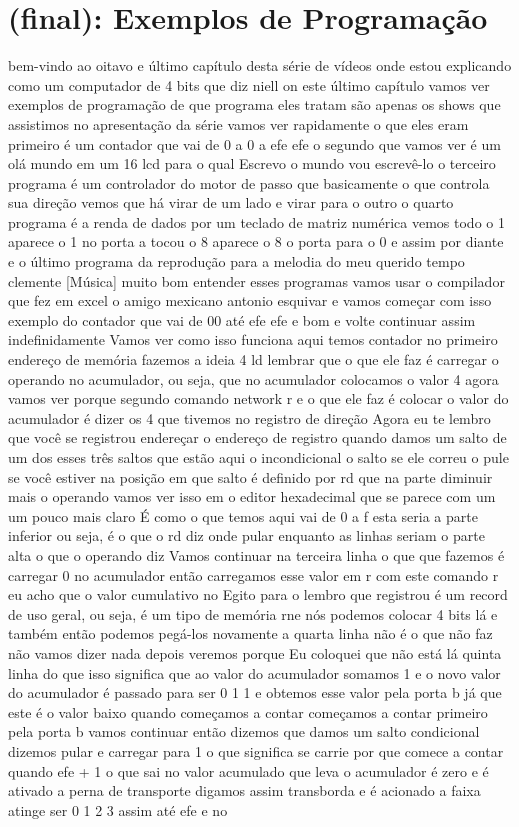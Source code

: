 \documentclass[oneside,11pt]{memoir} %
\begin{document}
\chapter{(final): Exemplos de Programação}
bem-vindo ao oitavo e último capítulo  desta série de vídeos onde estou  explicando como um  computador de 4 bits que diz niell on  este último capítulo  vamos ver exemplos de programação  de que programa eles tratam são apenas  os shows que assistimos no  apresentação da série  vamos ver rapidamente o que eles eram  primeiro é um contador que vai de 0 a 0 a  efe efe  o segundo que vamos ver é um olá  mundo em um 16 lcd para o qual  Escrevo o mundo vou escrevê-lo  o terceiro programa é um controlador do  motor de passo que basicamente o que  controla sua direção  vemos que há virar de um lado e virar  para o outro  o quarto programa é a renda de  dados por um teclado de matriz numérica  vemos todo o 1 aparece o 1 no  porta a tocou o 8 aparece o 8 o  porta para o 0 e assim por diante  e o último programa da reprodução  para a melodia do meu querido tempo clemente  [Música]  muito bom entender esses programas  vamos usar o compilador que fez  em excel o amigo mexicano antonio  esquivar e vamos começar com isso  exemplo do contador que vai de 00  até efe efe e bom e volte  continuar assim indefinidamente  Vamos ver como isso funciona  aqui temos contador  no primeiro endereço de memória  fazemos a ideia 4  ld lembrar que o que ele faz é carregar  o operando no acumulador, ou seja,  que no acumulador colocamos o valor 4  agora vamos ver porque  segundo comando network r e o que ele faz  é colocar o valor do acumulador é  dizer os 4 que tivemos no registro  de direção  Agora eu te lembro que você se registrou  endereçar o endereço de registro quando  damos um salto de um dos  esses três saltos que estão aqui o  incondicional o salto se ele correu o  pule se você estiver na posição em que  salto é definido por rd que na parte  diminuir mais o operando vamos ver isso em  o editor hexadecimal que se parece com um  um pouco mais claro  É como o que temos aqui vai  de 0 a f esta seria a parte inferior  ou seja, é o que o rd diz onde  pular enquanto as linhas seriam o  parte alta o que o operando diz  Vamos continuar na terceira linha o que  que fazemos é carregar 0 no acumulador  então carregamos esse valor em r  com este comando r eu acho que o  valor cumulativo no Egito para o  lembro que registrou é um record  de uso geral, ou seja, é um  tipo de memória rne nós  podemos colocar 4 bits lá e também  então podemos pegá-los novamente  a quarta linha não é o que não faz  não vamos dizer nada depois veremos porque  Eu coloquei que não está lá  quinta linha do que isso significa  que ao valor do acumulador somamos 1  e o novo valor do acumulador é passado para  ser 0 1 1  e obtemos esse valor pela porta b  já que este é o valor baixo quando  começamos a contar começamos a contar  primeiro pela porta b  vamos continuar  então dizemos que damos um salto  condicional dizemos pular e carregar  para 1 o que significa se carrie por que  comece a contar quando efe + 1  o que sai no valor acumulado que  leva o acumulador é zero e é ativado  a perna de transporte digamos assim  transborda e é acionado a faixa atinge  ser 0 1 2 3 assim até efe e no  
\end{document}
